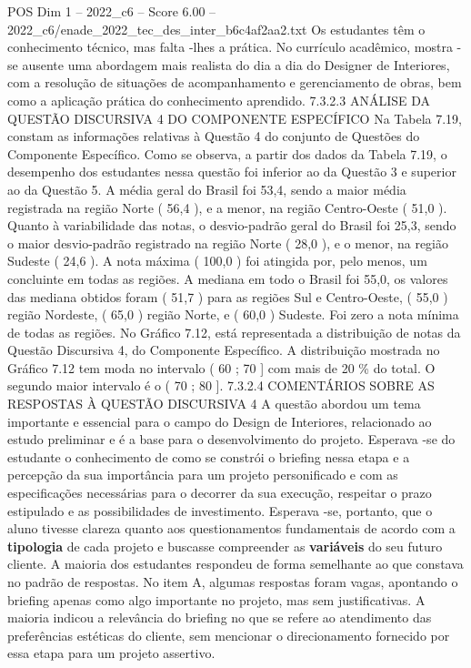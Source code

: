 \begin{textsample}{POS Dim 1 – 2022\_c6 – Score 6.00 – 2022\_c6/enade\_2022\_tec\_des\_inter\_b6c4af2aa2.txt}
Os estudantes têm o conhecimento técnico, mas falta -lhes a prática.
No currículo acadêmico, mostra -se ausente uma abordagem mais realista do dia a dia do Designer de Interiores, com a resolução de situações de acompanhamento e gerenciamento de obras, bem como a aplicação prática do conhecimento aprendido. 7.3.2.3 ANÁLISE DA QUESTÃO DISCURSIVA 4 DO COMPONENTE ESPECÍFICO Na Tabela 7.19, constam as informações relativas à Questão 4 do conjunto de Questões do Componente Específico.
Como se observa, a partir dos dados da Tabela 7.19, o desempenho dos estudantes nessa questão foi inferior ao da Questão 3 e superior ao da Questão 5.
A média geral do Brasil foi 53,4, sendo a maior média registrada na região Norte ( 56,4 ), e a menor, na região Centro-Oeste ( 51,0 ).
Quanto à variabilidade das notas, o desvio-padrão geral do Brasil foi 25,3, sendo o maior desvio-padrão registrado na região Norte ( 28,0 ), e o menor, na região Sudeste ( 24,6 ).
A nota máxima ( 100,0 ) foi atingida por, pelo menos, um concluinte em todas as regiões.
A mediana em todo o Brasil foi 55,0, os valores das mediana obtidos foram ( 51,7 ) para as regiões Sul e Centro-Oeste, ( 55,0 ) região Nordeste, ( 65,0 ) região Norte, e ( 60,0 ) Sudeste.
Foi zero a nota mínima de todas as regiões.
No Gráfico 7.12, está representada a distribuição de notas da Questão Discursiva 4, do Componente Específico.
A distribuição mostrada no Gráfico 7.12 tem moda no intervalo ( 60 ; 70 ] com mais de 20 \% do total.
O segundo maior intervalo é o ( 70 ; 80 ]. 7.3.2.4 COMENTÁRIOS SOBRE AS RESPOSTAS À QUESTÃO DISCURSIVA 4 A questão abordou um tema importante e essencial para o campo do Design de Interiores, relacionado ao estudo preliminar e é a base para o desenvolvimento do projeto.
Esperava -se do estudante o conhecimento de como se constrói o briefing nessa etapa e a percepção da sua importância para um projeto personificado e com as especificações necessárias para o decorrer da sua execução, respeitar o prazo estipulado e as possibilidades de investimento.
Esperava -se, portanto, que o aluno tivesse clareza quanto aos questionamentos fundamentais de acordo com a \textbf{tipologia} de cada projeto e buscasse compreender as \textbf{variáveis} do seu futuro cliente.
A maioria dos estudantes respondeu de forma semelhante ao que constava no padrão de respostas.
No item A, algumas respostas foram vagas, apontando o briefing apenas como algo importante no projeto, mas sem justificativas.
A maioria indicou a relevância do briefing no que se refere ao atendimento das preferências estéticas do cliente, sem mencionar o direcionamento fornecido por essa etapa para um projeto assertivo.

\end{textsample}
